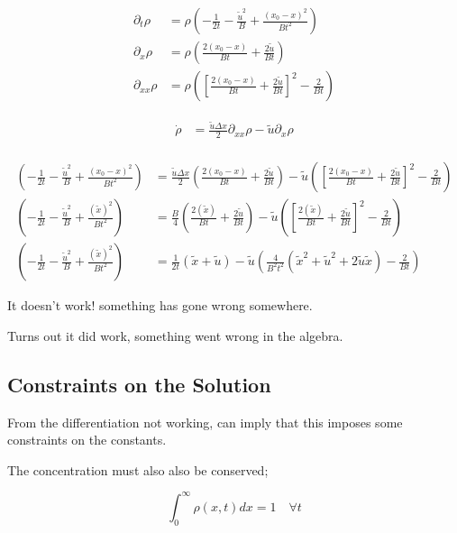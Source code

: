 \documentclass[a4paper]{article}
\begin{document}
\begin{align*}
\partial _t \rho & = \rho \left( - \frac{1}{2t} - \frac{\tilde{u} ^2}{B} + \frac{(x_0 - x)^2}{Bt^2} \right) \\
\partial _x \rho & = \rho \left( \frac{2(x_0 -x )}{Bt} + \frac{2 \tilde{u}}{Bt} \right) \\
\partial_{xx} \rho & = \rho \left( \left[ \frac{2(x_0 -x )}{Bt} + \frac{2 \tilde{u}}{Bt} \right] ^2 - \frac{2}{Bt} \right)
\end{align*}

\begin{align*}
\dot{\rho} & = \frac{\tilde{u} \Delta x}{2} \partial _{xx} \rho - \tilde{u} \partial _x \rho \\
\end{align*}

\begin{align*}
\left( - \frac{1}{2t} - \frac{\tilde{u} ^2}{B} + \frac{(x_0 - x)^2}{Bt^2} \right) & = \frac{\tilde{u} \Delta x}{2} \left( \frac{2(x_0 -x )}{Bt} + \frac{2 \tilde{u}}{Bt} \right) - \tilde{u} \left( \left[ \frac{2(x_0 -x )}{Bt} + \frac{2 \tilde{u}}{Bt} \right] ^2 - \frac{2}{Bt} \right) \\
\left( - \frac{1}{2t} - \frac{\tilde{u} ^2}{B} + \frac{(\tilde{x})^2}{Bt^2} \right) & = \frac{B}{4} \left( \frac{2(\tilde{x})}{Bt} + \frac{2 \tilde{u}}{Bt} \right) - \tilde{u} \left( \left[ \frac{2(\tilde{x} )}{Bt} + \frac{2 \tilde{u}}{Bt} \right] ^2 - \frac{2}{Bt} \right) \\
\left( - \frac{1}{2t} - \frac{\tilde{u} ^2}{B} + \frac{(\tilde{x})^2}{Bt^2} \right) & = \frac{1}{2t} (\tilde{x} + \tilde{u} ) - \tilde{u} \left( \frac{4}{B^2 t^2}( \tilde{x} ^2 + \tilde{u}^2 + 2 \tilde{u} \tilde{x} ) - \frac{2}{Bt} \right)
\end{align*}

It doesn't work! something has gone wrong somewhere. 

Turns out it did work, something went wrong in the algebra. 

\subsection*{Constraints on the Solution}

From the differentiation not working, can imply that this imposes some constraints on the constants. 

The concentration must also also be conserved; 

\begin{equation}
\int _0 ^\infty \rho (x,t ) dx = 1 \quad \forall t
\end{equation}
\end{document}
